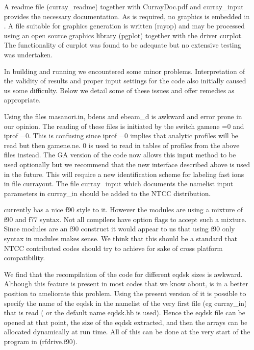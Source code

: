  A readme file (curray\_readme) together with CurrayDoc.pdf and
 curray\_input  provides  the necessary documentation. 
 As is required, no graphics is embedded in \ct . A  file suitable
 for graphics generation is written (rayop)  and may be processed using
 an open source graphics library (pgplot) together with the driver
 curplot. The functionality of curplot was found to be adequate but no
 extensive testing was undertaken. 
  

    In building and running \ct we encountered some minor problems.
    Interpretation of the validity of  results and proper input
    settings for the code also initially caused us some difficulty.
    Below  we detail some of these issues and offer
    remedies as appropriate. 
  

  Using the  files masanori.in, bdens
  and ebeam\_d is awkward and error prone in our opinion.  The reading
  of these files is initiated by the switch gamene =0 and
 iprof =0. This is confusing since iprof =0 implies that 
 analytic profiles will be read but then gamene.ne. 0 is used to
 read in tables of profiles from the above files instead.  
  The GA version of the
  code now allows this input method to be used  optionally but we
  recommend that the new \ot interface described above is used in the
  future. This will require a new identification scheme for labeling
  fast ions in file currayout. The file curray\_input which documents the namelist input
 parameters in curray\_in should be added to the NTCC distribution.

 \ct currently has a nice f90 style to it. However the modules
  are using a mixture of f90 and f77 syntax. Not all compilers have
  option flags to accept such a mixture. Since modules are an f90
  construct it would appear to us that using f90 only syntax in
  modules makes sense. We think that this should be a standard
 that NTCC contributed codes should try to achieve for sake of cross
 platform compatibility.

  We find that the recompilation of the code for different eqdsk sizes
  is awkward. Although this feature is present in most codes that we
  know about, \ct is in a better position to ameliorate this
  problem. Using the present version of \ct it is possible to 
  specify the name of the eqdsk in the namelist of the very first file 
  (eg curray\_in) that is read ( or the default name eqdsk.hb is used).
  Hence the eqdsk file can be opened
 at that point, the size of the eqdsk extracted, and then the
 arrays can be allocated dynamically at run time. All of this
 can be done at the very start of the program in (rfdrive.f90).


